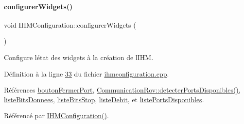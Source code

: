 \paragraph{\texorpdfstring{configurer\+Widgets()}{configurerWidgets()}}
{\footnotesize\ttfamily void I\+H\+M\+Configuration\+::configurer\+Widgets (\begin{DoxyParamCaption}{ }\end{DoxyParamCaption})\hspace{0.3cm}{\ttfamily [private]}}



Configure l\textquotesingle{}état des widgets à la création de l\textquotesingle{}I\+HM. 



Définition à la ligne \hyperlink{ihmconfiguration_8cpp_source_l00033}{33} du fichier \hyperlink{ihmconfiguration_8cpp_source}{ihmconfiguration.\+cpp}.



Références \hyperlink{ihmconfiguration_8h_source_l00030}{bouton\+Fermer\+Port}, \hyperlink{communicationrov_8cpp_source_l00090}{Communication\+Rov\+::detecter\+Ports\+Disponibles()}, \hyperlink{ihmconfiguration_8h_source_l00027}{liste\+Bits\+Donnees}, \hyperlink{ihmconfiguration_8h_source_l00028}{liste\+Bits\+Stop}, \hyperlink{ihmconfiguration_8h_source_l00026}{liste\+Debit}, et \hyperlink{ihmconfiguration_8h_source_l00025}{liste\+Ports\+Disponibles}.



Référencé par \hyperlink{ihmconfiguration_8cpp_source_l00009}{I\+H\+M\+Configuration()}.


